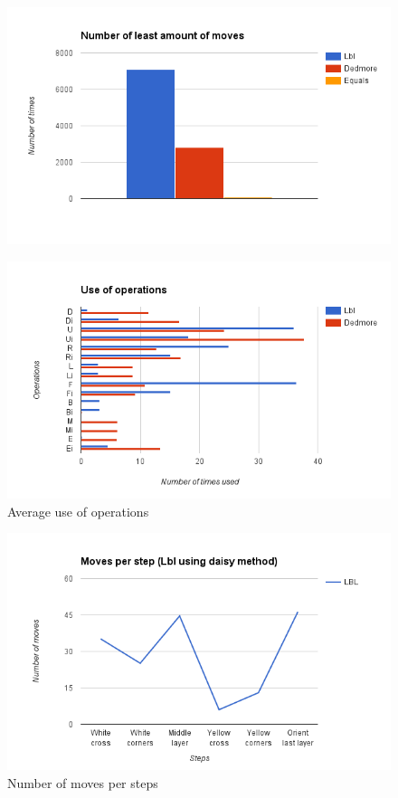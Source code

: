 \documentclass[a4paper,11pt]{kth-mag}
\begin{document}
\begin{figure}[ht!]
	\centering
	\includegraphics[width= 1.0\textwidth]{figs/graphtwo.png}
	\caption{}
	\label{fig_19}
\end{figure}
\begin{figure}[ht!]
	\centering
	\includegraphics[width= 1.0\textwidth]{figs/graphthree.png}
	\caption{Average use of operations}
	\label{fig_20}
\end{figure}
\begin{figure}[ht!]
	\centering
	\includegraphics[width= 1.0\textwidth]{figs/lbldaisysteps.png}
	\caption{Number of moves per steps}
	\label{fig_21}
\end{figure}
\end{document}
